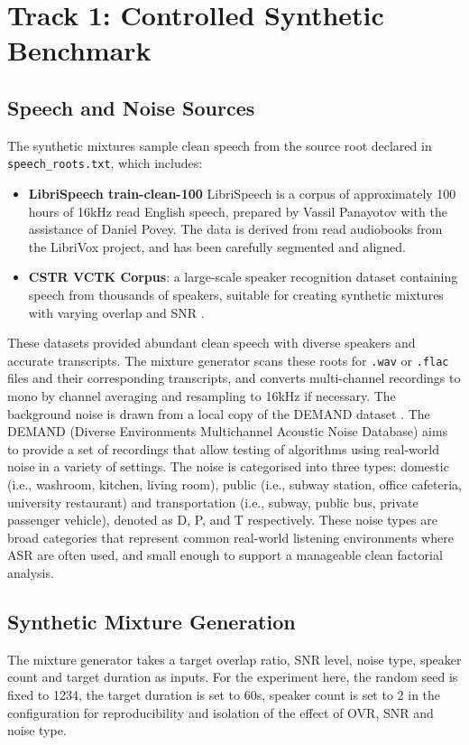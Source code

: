 \section{Track 1: Controlled Synthetic Benchmark}
\subsection{Speech and Noise Sources}
\label{sec:speech_noise_sources}
The synthetic mixtures sample clean speech from the source root declared in \texttt{speech\_roots.txt}, which includes:
\begin{itemize}
    \item \textbf{LibriSpeech train-clean-100} LibriSpeech is a corpus of approximately 100 hours of 16kHz read English speech, prepared by Vassil Panayotov with the assistance of Daniel Povey. The data is derived from read audiobooks from the LibriVox project, and has been carefully segmented and aligned. \cite{librispeech}
    \item \textbf{CSTR VCTK Corpus}: a large-scale speaker recognition dataset containing speech from thousands of speakers, suitable for creating synthetic mixtures with varying overlap and SNR \cite{voxceleb}.
\end{itemize}
These datasets provided abundant clean speech with diverse speakers and accurate transcripts. The mixture generator scans these roots for \texttt{.wav} or \texttt{.flac} files and their corresponding transcripts, and converts multi-channel recordings to mono by channel averaging and resampling to 16kHz if necessary. 
The background noise is drawn from a local copy of the DEMAND dataset \cite{demand}. The DEMAND (Diverse Environments Multichannel Acoustic Noise Database) aims to provide a set of recordings that allow testing of algorithms using real-world noise in a variety of settings. The noise is categorised into three types: domestic (i.e., washroom, kitchen, living room), public (i.e., subway station, office cafeteria, university restaurant) and transportation (i.e., subway, public bus, private passenger vehicle), denoted as D, P, and T respectively. These noise types are broad categories that represent common real-world listening environments where ASR are often used, and small enough to support a manageable clean factorial analysis. 

\subsection{Synthetic Mixture Generation}
The mixture generator takes a target overlap ratio, SNR level, noise type, speaker count and target duration as inputs. For the experiment here, the random seed is fixed to 1234, the target duration is set to 60s, speaker count is set to 2 in the configuration for reproducibility and isolation of the effect of OVR, SNR and noise type.

